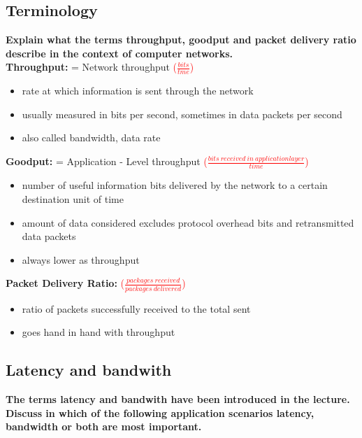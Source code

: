 \documentclass[a4paper,12pt]{article}
\begin{document}
	
\subsection{Terminology}
	\textbf{Explain what the terms throughput, goodput and packet delivery ratio describe in the context of computer networks.}\\
	
	\textbf{Throughput:} = Network throughput
	\textcolor{red}{($\frac{bits}{tme}$)}
	\begin{itemize}[itemsep=0pt]
		\item  rate at which information is sent through the network
		\item  usually measured in bits per second, sometimes in data packets per second
		\item  also called bandwidth, data rate
	\end{itemize}
	
	\textbf{Goodput:}  = Application - Level throughput
	\textcolor{red}{($\frac{bits\ received\ in\ application layer}{time}$)}
	\begin{itemize}[itemsep=0pt]
		\item  number of useful information bits delivered by the network to a certain destination unit of time
		\item  amount of data considered excludes protocol overhead bits and retransmitted data packets
		\item  always lower as throughput
	\end{itemize}
	
	\textbf{Packet Delivery Ratio:} \textcolor{red}{($\frac{packages\ received}{packages\ delivered}$)}
	\begin{itemize}[itemsep=0pt]
		\item  ratio of packets successfully received to the total sent
		\item  goes hand in hand with throughput
	\end{itemize}
	
	
\subsection{Latency and bandwith}
	\textbf{The terms latency and bandwith have been introduced in the lecture. Discuss in which of the following application scenarios latency, bandwidth or both are most important.}\\
	
\end{document}

